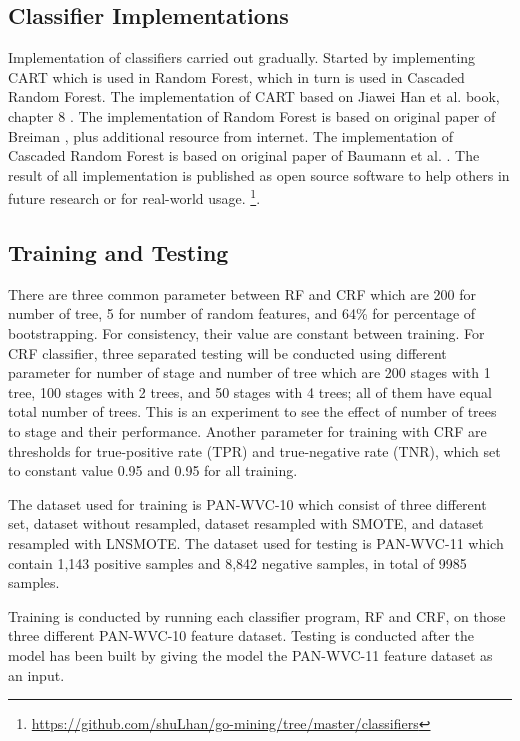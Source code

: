 \documentclass[conference,compsoc,a4paper,twocolumn,final]{IEEEtran}
\begin{document}


\subsection{Classifier Implementations}

Implementation of classifiers carried out gradually.
Started by implementing CART which is used in Random Forest, which in turn is
used in Cascaded Random Forest.
The implementation of CART based on Jiawei Han et al. book, chapter 8
\cite{han2011data}.
The implementation of Random Forest is based on original paper of Breiman
\cite{breiman2001random}, plus additional resource from internet.
The implementation of Cascaded Random Forest is based on original paper of
Baumann et al.
\cite{baumann2013cascaded}.
The result of all implementation is published as open source software to help
others in future research or for real-world usage.
\footnote{\url{https://github.com/shuLhan/go-mining/tree/master/classifiers}}.


\subsection{Training and Testing}

There are three common parameter between RF and CRF which are 200 for number of
tree, 5 for number of random features, and 64\% for percentage of
bootstrapping.
For consistency, their value are constant between training.
For CRF classifier, three separated testing will be conducted using different
parameter for number of stage and number of tree which are 200 stages with 1
tree, 100 stages with 2 trees, and 50 stages with 4 trees; all of them have
equal total number of trees.
This is an experiment to see the effect of number of trees to stage and their
performance.
Another parameter for training with CRF are thresholds for true-positive rate
(TPR) and true-negative rate (TNR), which set to constant value 0.95 and 0.95
for all training.

The dataset used for training is PAN-WVC-10 which consist of three different
set, dataset without resampled, dataset resampled with SMOTE, and dataset
resampled with LNSMOTE.
The dataset used for testing is PAN-WVC-11 which contain 1,143 positive
samples and 8,842 negative samples, in total of 9985 samples.

Training is conducted by running each classifier program, RF and CRF, on
those three different PAN-WVC-10 feature dataset.
Testing is conducted after the model has been built by giving the model the
PAN-WVC-11 feature dataset as an input.
\end{document}
